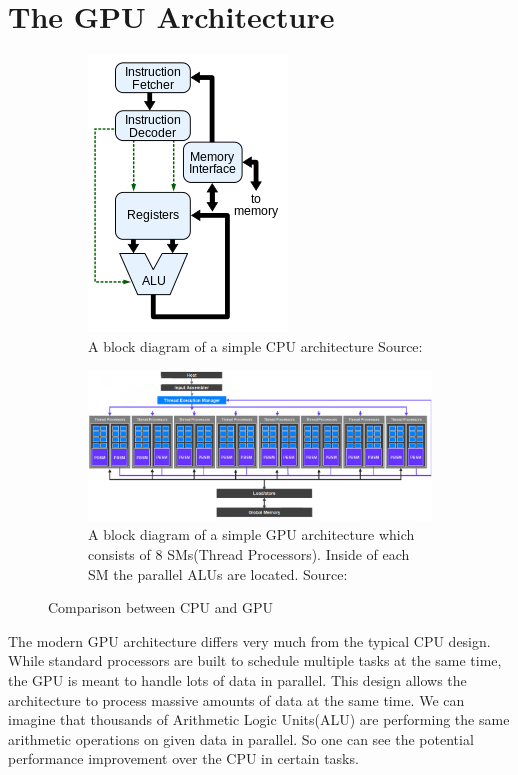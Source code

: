 \documentclass[draft, final]{vutinfth} %
\begin{document}
	\section{The GPU Architecture}
		\begin{figure}[!ht]
			\centering
			\begin{subfigure}[t]{.5\textwidth}
				\centering
				\includegraphics[width=0.4\linewidth]{images/200px-CPU_block_diagram.png}
				\caption{A block diagram of a simple CPU architecture Source: \cite{wiki:CPU_block_dia}}
				\label{fig:cpu arch}
			\end{subfigure}

			\begin{subfigure}[t]{.9\textwidth}
				\centering
				\includegraphics[width=\linewidth]{images/GPU-architecture-2.png}
				\caption{A block diagram of a simple GPU architecture which consists of 8 SMs(Thread Processors). Inside of each SM the parallel ALUs are located. Source: \cite{tatourian}}
				\label{fig:gpu arch}
			\end{subfigure}

			\caption{Comparison between CPU and GPU}
			\label{fig:gpu_vs._cpu}
		\end{figure}

		The modern GPU architecture differs very much from the typical CPU design. While standard processors are built to schedule multiple tasks at the same time, the GPU is meant to handle lots of data in parallel. This design allows the architecture to process massive amounts of data at the same time. We can imagine that thousands of Arithmetic Logic Units(ALU) are performing the same arithmetic operations on given data in parallel. So one can see the potential performance improvement over the CPU in certain tasks.
\end{document}
